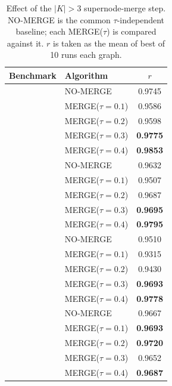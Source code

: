 
\begin{table}[t]
\centering
\caption{Effect of the $|K|>3$ supernode-merge step. NO-MERGE is the
common $\tau$-independent baseline; each MERGE($\tau$) is compared against it.
$r$ is taken as the mean of best of 10 runs each graph.}
\label{tab:merge-sweep}
\begin{tabular}{llc}
\toprule
Benchmark & Algorithm & $r$ \\
\midrule
{}
 & NO-MERGE            & 0.9745 \\
 & MERGE($\tau{=}0.1$) & 0.9586 \\
 & MERGE($\tau{=}0.2$) & 0.9598 \\
 & MERGE($\tau{=}0.3$) & \textbf{0.9775} \\
 & MERGE($\tau{=}0.4$) & \textbf{0.9853} \\
\midrule
{}
 & NO-MERGE            & 0.9632 \\
 & MERGE($\tau{=}0.1$) & 0.9507 \\
 & MERGE($\tau{=}0.2$) & 0.9687 \\
 & MERGE($\tau{=}0.3$) & \textbf{0.9695} \\
 & MERGE($\tau{=}0.4$) & \textbf{0.9795} \\
\midrule
{}
 & NO-MERGE            & 0.9510 \\
 & MERGE($\tau{=}0.1$) & 0.9315 \\
 & MERGE($\tau{=}0.2$) & 0.9430 \\
 & MERGE($\tau{=}0.3$) & \textbf{0.9693} \\
 & MERGE($\tau{=}0.4$) & \textbf{0.9778} \\
\midrule
{}
 & NO-MERGE            & 0.9667 \\
 & MERGE($\tau{=}0.1$) & \textbf{0.9693} \\
 & MERGE($\tau{=}0.2$) & \textbf{0.9720} \\
 & MERGE($\tau{=}0.3$) & 0.9652 \\
 & MERGE($\tau{=}0.4$) & \textbf{0.9687} \\
\bottomrule
\end{tabular}
\end{table}

